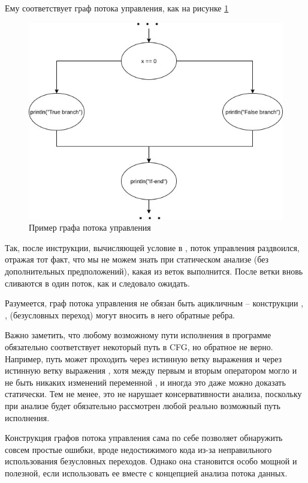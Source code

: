Ему соответствует граф потока управления, как на рисунке \ref{control-flow-example}

\begin{figure}
    \centering
    \includegraphics[scale=0.5]{img/control-flow-example}
    \caption{Пример графа потока управления}
    \label{control-flow-example}
\end{figure}


Так, после инструкции, вычисляющей условие в , поток управления раздвоился, отражая тот факт, что мы не можем знать при статическом анализе (без дополнительных предположений), какая из веток выполнится. После ветки вновь сливаются в один поток, как и следовало ожидать.

Разумеется, граф потока управления не обязан быть ацикличным -- конструкции , ,  (безусловных переход) могут вносить в него обратные ребра.

Важно заметить, что любому возможному пути исполнения в программе обязательно соответствует некоторый путь в CFG, но обратное не верно. Например, путь может проходить через истинную ветку выражения \linebreak {} и через истинную ветку выражения , хотя между первым и вторым оператором могло и не быть никаких изменений переменной , и иногда это даже можно доказать статически.
Тем не менее, это не нарушает консервативности анализа, поскольку при анализе будет обязательно рассмотрен любой реально возможный путь исполнения. 

Конструкция графов потока управления сама по себе позволяет обнаружить совсем простые ошибки, вроде недостижимого кода из-за неправильного использования безусловных переходов. Однако она становится особо мощной и полезной, если использовать ее вместе с концепцией анализа потока данных.

